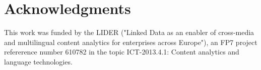 \documentclass[smallextended]{svjour3}       %
\begin{document}

\section*{Acknowledgments}

This work was funded by the LIDER ("Linked Data as an enabler of                
cross-media and multilingual content analytics for enterprises across Europe"), 
an FP7 project refererence number 610782 in the topic ICT-2013.4.1: Content     
analytics and language technologies.

\end{document}
